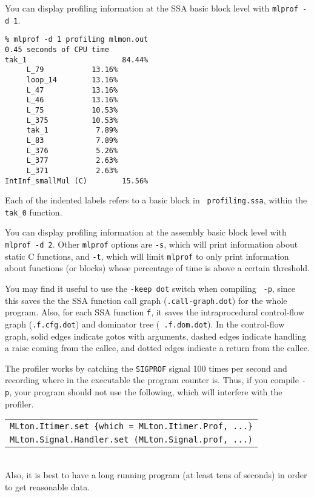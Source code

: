 You can display profiling information at the SSA basic block level with
{\tt mlprof -d 1}.

\begin{verbatim}
% mlprof -d 1 profiling mlmon.out
0.45 seconds of CPU time
tak_1                      84.44%
     L_79           13.16%       
     loop_14        13.16%       
     L_47           13.16%       
     L_46           13.16%       
     L_75           10.53%       
     L_375          10.53%       
     tak_1           7.89%       
     L_83            7.89%       
     L_376           5.26%       
     L_377           2.63%       
     L_371           2.63%       
IntInf_smallMul (C)        15.56%
\end{verbatim}
Each of the indented labels refers to a basic block in {\tt
  profiling.ssa}, within the {\tt tak\_0} function.

You can display profiling information at the assembly basic block level with
{\tt mlprof -d 2}.  Other {\tt mlprof} options are
{\tt -s}, which will print information about static C functions, and {\tt -t},
which will limit {\tt mlprof} to only print information about functions (or
blocks) whose percentage of time is above a certain threshold.

You may find it useful to use the {\tt -keep dot} switch when compiling {\tt
-p}, since this saves the the SSA function call graph ({\tt .call-graph.dot})
for the whole program.  Also, for each SSA function {\tt f}, it saves the
intraprocedural control-flow graph ({\tt .f.cfg.dot}) and dominator tree ({\tt
.f.dom.dot}).  In the control-flow graph, solid edges indicate gotos with
arguments, dashed edges indicate handling a raise coming from the callee, and
dotted edges indicate a return from the callee.

The profiler works by catching the {\tt SIGPROF} signal 100 times per second and
recording where in the executable the program counter is.  Thus, if you compile
{\tt -p}, your program should not use the following, which will interfere with
the profiler.\\
\begin{tabular}{l}
\tt MLton.Itimer.set \{which = MLton.Itimer.Prof, ...\}\\
\tt MLton.Signal.Handler.set (MLton.Signal.prof, ...)
\end{tabular}\\
Also, it is best to have a long running program (at least tens of seconds) in
order to get reasonable data. 
